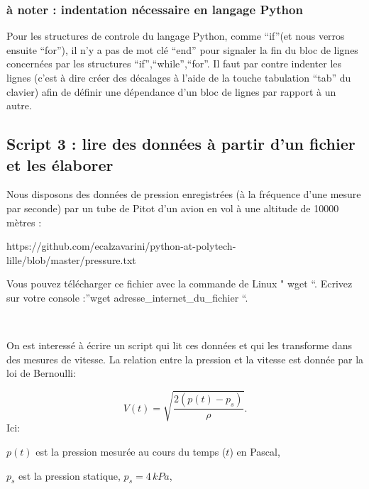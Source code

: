 \documentclass{article}
\begin{document}
    \subsubsection{à noter : indentation nécessaire en langage
Python}\label{uxe0-noter-indentation-nuxe9cessaire-en-langage-python}

    Pour les structures de controle du langage Python, comme ``if''(et nous
verros ensuite ``for''), il n'y a pas de mot clé ``end'' pour signaler
la fin du bloc de lignes concernées par les structures
``if'',``while'',``for''. Il faut par contre indenter les lignes (c'est
à dire créer des décalages à l'aide de la touche tabulation ``tab'' du
clavier) afin de définir une dépendance d'un bloc de lignes par rapport
à un autre.

    \subsection{Script 3 : lire des données à partir d'un fichier et les
élaborer}\label{script-3-lire-des-donnuxe9es-uxe0-partir-dun-fichier-et-les-uxe9laborer}

    Nous disposons des données de pression enregistrées (à la fréquence
d'une mesure par seconde) par un tube de Pitot d'un avion en vol à une
altitude de 10000 mètres :

https://github.com/ecalzavarini/python-at-polytech-lille/blob/master/pressure.txt

Vous pouvez télécharger ce fichier avec la commande de Linux " wget ``.
Ecrivez sur votre console :''wget adresse\_internet\_du\_fichier ``.

    \begin{center}
    \end{center}
    { \hspace*{\fill} \\}
    

    On est interessé à écrire un script qui lit ces données et qui les
transforme dans des mesures de vitesse. La relation entre la pression et
la vitesse est donnée par la loi de Bernoulli:

    \[V(t) = \sqrt{\frac{2\left(p(t)-p_s\right)}{\rho}}.\] Ici:

\(p(t)\) est la pression mesurée au cours du temps (\(t\)) en Pascal,

\(p_s\) est la pression statique, \(p_s=4 \, kPa\),
\end{document}
